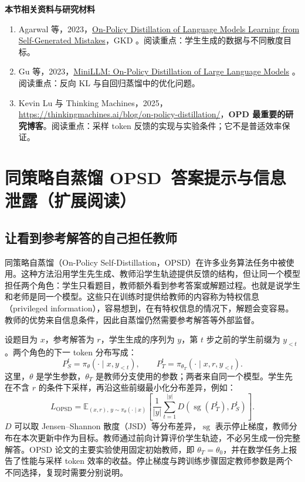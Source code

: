 \textbf{本节相关资料与研究材料}
\begin{enumerate}
    \item Agarwal 等，2023，\href{https://arxiv.org/abs/2306.13649}{On-Policy Distillation of Language Models Learning from Self-Generated Mistakes}，GKD 。阅读重点：学生生成的数据与不同散度目标。
    \item Gu 等，2023，\href{https://arxiv.org/abs/2306.08543}{MiniLLM: On-Policy Distillation of Large Language Models} 。阅读重点：反向 KL 与自回归蒸馏中的优化问题。
    \item Kevin Lu 与 Thinking Machines，2025，\href{https://thinkingmachines.ai/blog/on-policy-distillation/}{https://thinkingmachines.ai/blog/on-policy-distillation/}，\textbf{OPD 最重要的研究博客}。阅读重点：采样 token 反馈的实现与实验条件；它不是普适效率保证。
\end{enumerate}

\section{同策略自蒸馏 OPSD~答案提示与信息泄露（扩展阅读）}\label{同策略自蒸馏 OPSD}

\subsection{让看到参考解答的自己担任教师}

同策略自蒸馏（On-Policy Self-Distillation，OPSD）在许多业务算法任务中被使用。这种方法沿用学生先生成、教师沿学生轨迹提供反馈的结构，但让同一个模型担任两个角色：学生只看题目，教师额外看到参考答案或解题过程。也就是说学生和老师是同一个模型。这些只在训练时提供给教师的内容称为特权信息（privileged information），容易想到，在有特权信息的情况下，解题会变容易。教师的优势来自信息条件，因此自蒸馏仍然需要参考解答等外部监督。

设题目为 $x$，参考解答为 $r$，学生生成的序列为 $y$，第 $t$ 步之前的学生前缀为 $y_{<t}$。两个角色的下一 token 分布写成：
\[
P_S^t=\pi_\theta(\cdot\mid x,y_{<t}),\qquad
P_T^t=\pi_{\theta_T}(\cdot\mid x,r,y_{<t}).
\]
这里，$\theta$ 是学生参数，$\theta_T$ 是教师分支使用的参数；两者来自同一个模型。学生先在不含 $r$ 的条件下采样，再沿这些前缀最小化分布差异，例如：
\[
L_{\mathrm{OPSD}}=
\mathbb E_{(x,r),\,y\sim\pi_\theta(\cdot\mid x)}
\left[\frac{1}{|y|}\sum_{t=1}^{|y|}
D\!\left(\operatorname{sg}(P_T^t),P_S^t\right)\right].
\]
$D$ 可以取 Jensen--Shannon 散度（JSD）等分布差异，$\operatorname{sg}$ 表示停止梯度，教师分布在本次更新中作为目标。教师通过前向计算评价学生轨迹，不必另生成一份完整解答。OPSD 论文的主要实验使用固定初始教师，即 $\theta_T=\theta_0$，并在数学任务上报告了性能与采样 token 效率的收益。停止梯度与跨训练步骤固定教师参数是两个不同选择，复现时需要分别说明。

